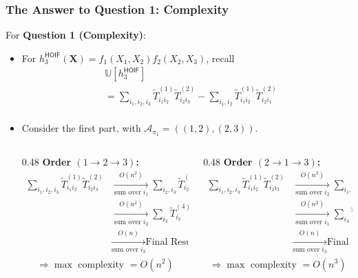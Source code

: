 \documentclass[9pt]{beamer}
\def\tilde{\widetilde}
\def\calA{\mathcal{A}}
\theoremstyle{mystyle}
\theoremstyle{mystyletwo}
\def\tilde{\widetilde}
\def\[{\left[}
\def\[{\left[}
\begin{document}
\begin{frame}
\frametitle{The Answer  to Question 1: Complexity}
    For {\bf Question 1 (Complexity)}:
    \begin{itemize}
        \item For $h^{\mathsf{HOIF}}_3(\bm{X}) = f_1(X_1,X_2) f_2(X_2,X_3)$, recall
        \begin{align*}
            & \mathbb{U}[h^{\mathsf{HOIF}}_3] \\
    & = \sum_{i_1,i_2,i_3} \tilde{T}^{(1)}_{i_1i_2} \tilde{T}^{(2)}_{i_2i_3}  - \sum_{i_1, i_2 } \tilde{T}^{(1)}_{i_1i_2} \tilde{T}^{(2)}_{i_2i_1} \\
        \end{align*}
    \item Consider the first part, with  $\calA_{\pi_1} = ((1,2),(2,3)).$
\begin{columns}[t] 

    \begin{column}{0.48\textwidth}
    \textbf{Order $(1 \to 2 \to 3)$:}
    \begin{align*}
    \sum_{i_1,i_2,i_3} \tilde{T}^{(1)}_{i_1i_2}\tilde{T}^{(2)}_{i_2i_3}
    &\xrightarrow[\text{sum over } i_1]{O(n^2)} 
       \sum_{i_2,i_3} \tilde{T}^{(3)}_{i_2}\tilde{T}^{(2)}_{i_2i_3} \\[0.5em]
    &\xrightarrow[\text{sum over } i_2]{O(n^2)} 
       \sum_{i_3} \tilde{T}^{(4)}_{i_3} \\[0.5em]
    &\xrightarrow[\text{sum over } i_3]{O(n)} 
       \text{Final Result}
    \end{align*}
    \begin{align*}
    \Rightarrow \max\text{ complexity } = O(n^2)
     \end{align*}
    \end{column}


    \begin{column}{0.48\textwidth}
    \textbf{Order $(2 \to 1 \to 3)$:}
    \begin{align*}
    \sum_{i_1,i_2,i_3} \tilde{T}^{(1)}_{i_1i_2}\tilde{T}^{(2)}_{i_2i_3}
    &\xrightarrow[\text{sum over } i_2]{O(n^3)} 
       \sum_{i_1,i_3} \tilde{T}^{(5)}_{i_1i_3} \\[0.5em]
    &\xrightarrow[\text{sum over } i_1]{O(n^2)} 
       \sum_{i_3} \tilde{T}^{(6)}_{i_3} \\[0.5em]
    &\xrightarrow[\text{sum over } i_3]{O(n)} 
       \text{Final Result}
    \end{align*}
      \begin{align*}
    \Rightarrow \max\text{ complexity } = O(n^3)
     \end{align*}
    \end{column}
\end{columns}


        
    \end{itemize}
   
\end{frame}
\end{document}
